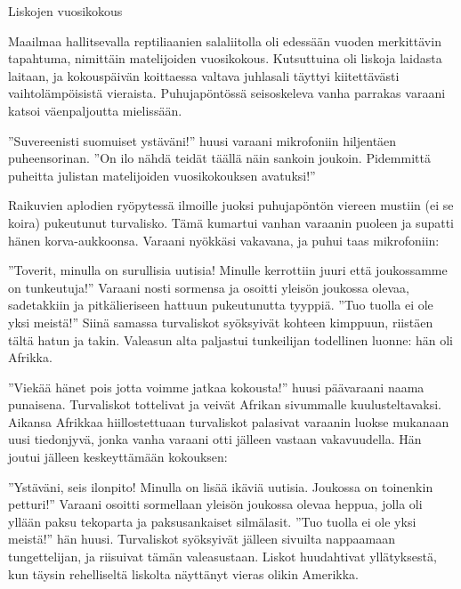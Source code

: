 \headerfooteroff{}
{\large Liskojen vuosikokous}\\
\vspace{1mm}

{\small Maailmaa hallitsevalla reptiliaanien salaliitolla oli edes\-sään vuoden merkittävin tapahtuma, nimittäin matelijoiden vuosi\-kokous. Kutsuttuina oli liskoja laidasta laitaan, ja ko\-kous\-päi\-vän koit\-taessa valtava juhlasali täyttyi kiitettävästi vaihtolämpöisistä vie\-rais\-ta. Puhujapöntössä seisoskeleva van\-ha parrakas varaani katsoi väenpaljoutta mielissään.\\
\vspace{1mm}

''Suvereenisti suomuiset ystäväni!'' huusi varaani mikro\-foniin hiljentäen puheensorinan. ''On ilo nähdä teidät täällä näin sankoin joukoin. Pidemmittä puheitta julistan ma\-te\-li\-joi\-den vuosikokouksen avatuksi!''\\
\vspace{1mm}

Raikuvien aplodien ryöpytessä ilmoille juoksi puhuja\-pön\-tön viereen mustiin (ei se koira) pukeutunut turvalisko. Tämä kumartui vanhan varaanin puoleen ja supatti hänen korva-aukkoonsa. Varaani nyökkäsi vakavana, ja puhui taas mikro\-foniin:\\
\vspace{1mm}

''Toverit, minulla on surullisia uutisia! Minulle kerrottiin juuri että joukossamme on tunkeutuja!'' Varaani nosti sor\-men\-sa ja osoitti yleisön joukossa olevaa, sade\-takkiin ja pitkä\-lieri\-seen hattuun pukeutunutta tyyppiä. ''Tuo tuolla ei ole yksi meistä!'' Siinä samassa turvaliskot syöksyivät kohteen kimppuun, riis\-tä\-en tältä hatun ja takin. Valeasun alta pal\-jas\-tui tunkeilijan todel\-linen luonne: hän oli Afrikka.\\
\vspace{1mm}

''Viekää hänet pois jotta voimme jatkaa kokousta!'' huusi päävaraani naama punaisena. Turvaliskot tottelivat ja veivät Afrikan sivummalle kuulusteltavaksi. Aikansa Afrikkaa hiil\-los\-tet\-tuaan turvaliskot palasivat varaanin luokse mukanaan uusi tiedon\-jyvä, jonka vanha varaani otti jälleen vastaan vakavuudella. Hän joutui jälleen keskeyttämään kokouksen:\\
\vspace{1mm}

''Ystäväni, seis ilonpito! Minulla on lisää ikäviä uutisia. Joukossa on toinenkin petturi!'' Varaani osoitti sormellaan yleisön joukossa olevaa heppua, jolla oli yllään paksu teko\-parta ja paksusankaiset silmälasit. ''Tuo tuolla ei ole yksi meistä!'' hän huusi. Turvaliskot syöksyivät jälleen sivuilta nappaamaan tungettelijan, ja riisuivat tämän valeasustaan. Liskot huu\-dah\-ti\-vat yllätyksestä, kun täysin rehelliseltä lis\-kol\-ta näyttänyt vieras olikin Amerikka.\\
\vspace{1mm}

}
